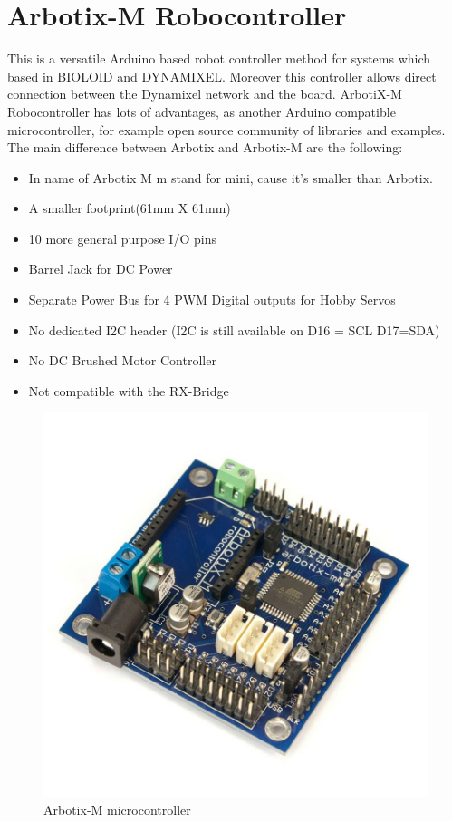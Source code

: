 			\newpage
		
	\section{Arbotix-M Robocontroller}
	
		\hspace{15pt}This is a versatile Arduino based robot controller method for systems which based in BIOLOID and DYNAMIXEL. Moreover this controller allows direct connection between the Dynamixel network and the board. ArbotiX-M Robocontroller has lots of advantages, as another Arduino compatible microcontroller, for example open source community of libraries and examples. The main difference between Arbotix and Arbotix-M are the following: 
		
		\begin{itemize}
			\item In name of Arbotix M m stand for mini, cause it’s smaller than Arbotix.
			\item A smaller footprint(61mm X 61mm)
			\item 10 more general purpose I/O pins
			\item Barrel Jack for DC Power
			\item Separate Power Bus for 4 PWM Digital outputs for Hobby Servos
			\item No dedicated I2C header (I2C is still available on D16 = SCL D17=SDA)
			\item No DC Brushed Motor Controller
			\item Not compatible with the RX-Bridge
		\end{itemize}
		
		\begin{figure}[H]
			\centering
			\includegraphics[scale=0.3]{./images/arbotix_m}
			\caption{Arbotix-M microcontroller}
		\end{figure}
		
